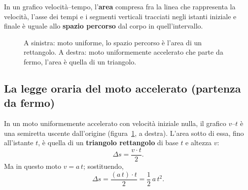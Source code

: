 \begin{definizione}
In un grafico velocità--tempo, l'\textbf{area} compresa fra la linea che rappresenta la velocità, l'asse dei tempi e i segmenti verticali tracciati negli istanti iniziale e finale è uguale allo \textbf{spazio percorso} dal corpo in quell'intervallo.
\end{definizione}

\begin{figure}[!htbp]
    \centering
    \caption{A sinistra: moto uniforme, lo spazio percorso è l'area di un rettangolo. A destra: moto uniformemente accelerato che parte da fermo, l'area è quella di un triangolo.}
    \label{fig:area-mru}
\end{figure}

\subsection{La legge oraria del moto accelerato (partenza da fermo)}
In un moto uniformemente accelerato con velocità iniziale nulla, il grafico $v$--$t$ è una semiretta uscente dall'origine (figura~\ref{fig:area-mru}, a destra). L'area sotto di essa, fino all'istante $t$, è quella di un \textbf{triangolo rettangolo} di base $t$ e altezza $v$:
\[ \Delta s = \frac{v \cdot t}{2}. \]
Ma in questo moto $v = a\,t$; sostituendo,
\[ \Delta s = \frac{(a\,t)\cdot t}{2} = \frac{1}{2}\,a\,t^2. \]

